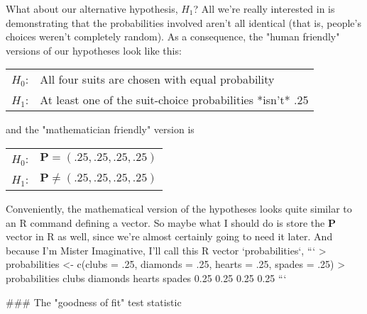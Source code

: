 What about our alternative hypothesis, $H_1$? All we're really interested in is demonstrating that the probabilities involved aren't all identical (that is, people's choices weren't completely random). As a consequence, the "human friendly" versions of our hypotheses look like this:

\smallskip
\begin{tabular}{ll}
$H_0$: \hspace*{0.5cm} & All four suits are chosen with equal probability \\
$H_1$: \hspace*{0.5cm} & At least one of the suit-choice probabilities *isn't* .25
\end{tabular} 
\smallskip


and the "mathematician friendly" version is

\smallskip
\begin{tabular}{ll}
$H_0$:\hspace*{0.5cm}  &  $\bm{P} = (.25, .25, .25, .25)$ \\
$H_1$: \hspace*{0.5cm} & $\bm{P} \neq (.25,.25,.25,.25)$ \\
\end{tabular} 
\smallskip



Conveniently, the mathematical version of the hypotheses looks quite similar to an R command defining a vector. So maybe what I should do is store the $\bm{P}$ vector in R as well,  since we're almost certainly going to need it later. And because I'm Mister Imaginative, I'll call this R vector `probabilities`,
```
> probabilities <- c(clubs = .25, diamonds = .25, hearts = .25, spades = .25) 
> probabilities
   clubs diamonds   hearts   spades 
    0.25     0.25     0.25     0.25 
```

### The "goodness of fit" test statistic


